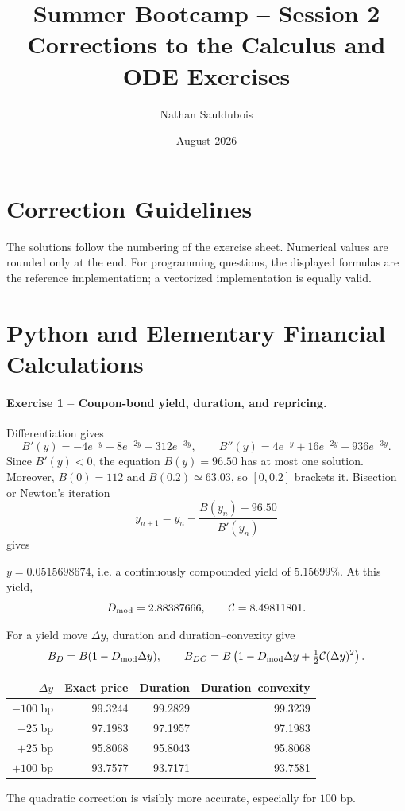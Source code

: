 \documentclass[10pt]{article}
\title{Summer Bootcamp -- Session 2\\Corrections to the Calculus and ODE Exercises}
\author{Nathan Sauldubois}
\date{August 2026}
\newcommand{\solution}[1]{\begin{tcolorbox}[breakable,colback=ResultBlue!3,colframe=ResultBlue,
  boxrule=0.8pt,arc=1mm,title=\textbf{Result},fonttitle=\bfseries]#1\end{tcolorbox}}
\begin{document}
\maketitle

\section*{Correction Guidelines}
The solutions follow the numbering of the exercise sheet. Numerical values are
rounded only at the end. For programming questions, the displayed formulas are
the reference implementation; a vectorized implementation is equally valid.

\section{Python and Elementary Financial Calculations}

\paragraph{Exercise 1 -- Coupon-bond yield, duration, and repricing.}
Differentiation gives
\[
B'(y)=-4e^{-y}-8e^{-2y}-312e^{-3y},\qquad
B''(y)=4e^{-y}+16e^{-2y}+936e^{-3y}.
\]
Since $B'(y)<0$, the equation $B(y)=96.50$ has at most one solution. Moreover,
$B(0)=112$ and $B(0.2)\simeq63.03$, so $[0,0.2]$ brackets it. Bisection or
Newton's iteration
\[
y_{n+1}=y_n-\frac{B(y_n)-96.50}{B'(y_n)}
\]
gives
\solution{$y=0.0515698674$, i.e. a continuously compounded yield of
$5.15699\%$. At this yield,
\[
D_{\rm mod}=2.88387666,\qquad \mathcal C=8.49811801.
\]}
For a yield move $\Delta y$, duration and duration--convexity give
\[
B_{D}=B(1-D_{\rm mod}\Delta y),\qquad
B_{DC}=B\left(1-D_{\rm mod}\Delta y+\tfrac12\mathcal C(\Delta y)^2\right).
\]
\begin{center}
\begin{tabular}{rrrr}
\toprule
$\Delta y$ & Exact price & Duration & Duration--convexity\\
\midrule
$-100$ bp & 99.3244 & 99.2829 & 99.3239\\
$-25$ bp  & 97.1983 & 97.1957 & 97.1983\\
$+25$ bp  & 95.8068 & 95.8043 & 95.8068\\
$+100$ bp & 93.7577 & 93.7171 & 93.7581\\
\bottomrule
\end{tabular}
\end{center}
The quadratic correction is visibly more accurate, especially for $100$ bp.
\end{document}
